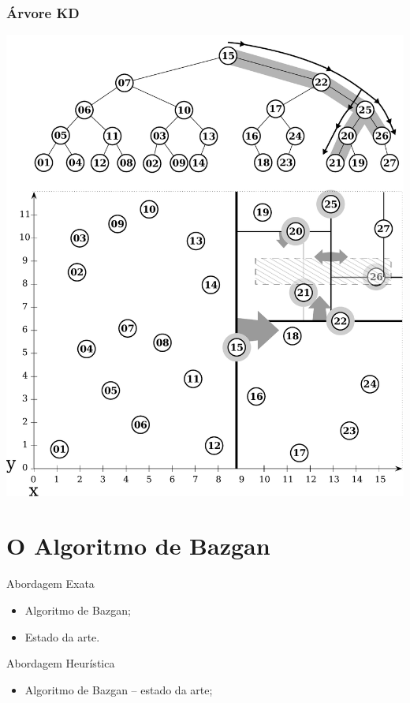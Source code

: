 \documentclass[10pt,xcolor=table,fleqn]{beamer}
\begin{document}
\begin{frame}
  \frametitle{Árvore KD}
  \begin{center}
    \includegraphics[scale=0.3]{../img/points-query/kdt/points-kdt-query}
  \end{center}
\end{frame}

\section{O Algoritmo de Bazgan}

\begin{frame}
  \begin{block}{Abordagem Exata}
    \begin{itemize}
      \item Algoritmo de Bazgan;
      \item Estado da arte.
    \end{itemize}
  \end{block}
  \begin{block}{Abordagem Heurística}
    \begin{itemize}
      \item Algoritmo de Bazgan -- estado da arte;
    \end{itemize}
  \end{block}
\end{frame}
\end{document}
